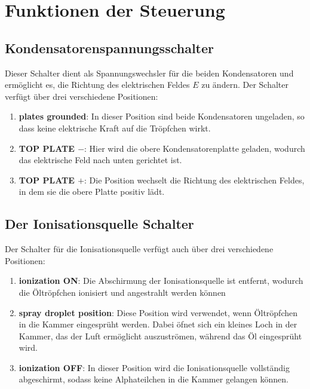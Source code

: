 \section{Funktionen der Steuerung}\label{sec:funktionen}
\subsection{Kondensatorenspannungsschalter}\label{sub:Spannungsschalter}
Dieser Schalter dient als Spannungswechsler für die beiden Kondensatoren und ermöglicht es, die Richtung des elektrischen Feldes $E$ zu ändern. Der Schalter verfügt über drei verschiedene Positionen: 

\begin{enumerate}
	\item \textbf{plates grounded}: In dieser Position sind beide Kondensatoren ungeladen, so dass keine elektrische Kraft auf die Tröpfchen wirkt.
	\item \textbf{TOP PLATE $-$}: Hier wird die obere Kondensatorenplatte geladen, wodurch das elektrische Feld nach unten gerichtet ist.
	\item \textbf{TOP PLATE $+$}: Die Position wechselt die Richtung des elektrischen Feldes, in dem sie die obere Platte positiv lädt.
\end{enumerate}

\subsection{Der Ionisationsquelle Schalter}\label{sub:ionisationquelle}
Der Schalter für die Ionisationsquelle verfügt auch über drei verschiedene Positionen: 

\begin{enumerate}
	\item \textbf{ionization ON}: Die Abschirmung der Ionisationsquelle ist entfernt, wodurch die Öltröpfchen ionisiert und angestrahlt werden können 
	\item \textbf{spray droplet position}: Diese Position wird verwendet, wenn Öltröpfchen in die Kammer eingesprüht werden. Dabei öfnet sich ein kleines Loch in der Kammer, das der Luft ermöglicht auszuströmen, während das Öl eingesprüht wird.
	\item \textbf{ionization OFF}: In dieser Position wird die Ionisationsquelle vollständig abgeschirmt, sodass keine Alphateilchen in die Kammer gelangen können.
\end{enumerate}

